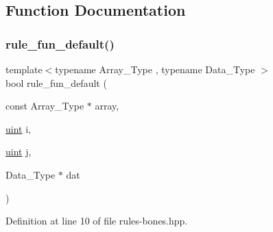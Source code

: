 \subsection{Function Documentation}
\mbox{\label{rules-bones_8hpp_aaeb0527576529579dd4cb51cb3ba73e0}} 
\subsubsection{\texorpdfstring{rule\+\_\+fun\+\_\+default()}{rule\_fun\_default()}}
{\footnotesize\ttfamily template$<$typename Array\+\_\+\+Type , typename Data\+\_\+\+Type $>$ \\
bool rule\+\_\+fun\+\_\+default (\begin{DoxyParamCaption}\item[{const Array\+\_\+\+Type $\ast$}]{array,  }\item[{\hyperlink{typedefs_8hpp_a91ad9478d81a7aaf2593e8d9c3d06a14}{uint}}]{i,  }\item[{\hyperlink{typedefs_8hpp_a91ad9478d81a7aaf2593e8d9c3d06a14}{uint}}]{j,  }\item[{Data\+\_\+\+Type $\ast$}]{dat }\end{DoxyParamCaption})}



Definition at line 10 of file rules-\/bones.\+hpp.

